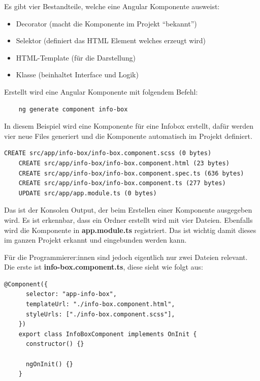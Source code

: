 \newpage

Es gibt vier Bestandteile, welche eine Angular Komponente ausweist:

\begin{itemize}
    \item Decorator (macht die Komponente im Projekt “bekannt”)
    \item Selektor (definiert das HTML Element welches erzeugt wird)
    \item HTML-Template (für die Darstellung)
    \item Klasse (beinhaltet Interface und Logik)
\end{itemize}

Erstellt wird eine Angular Komponente mit folgendem Befehl:

\begin{lstlisting}
    ng generate component info-box
\end{lstlisting}

In diesem Beispiel wird eine Komponente für eine Infobox erstellt, dafür werden vier neue Files generiert und die Komponente automatisch im Projekt definiert.

\begin{lstlisting}[caption=Komponente Erstellung Konsolenausgabe]
    CREATE src/app/info-box/info-box.component.scss (0 bytes)
    CREATE src/app/info-box/info-box.component.html (23 bytes)
    CREATE src/app/info-box/info-box.component.spec.ts (636 bytes)
    CREATE src/app/info-box/info-box.component.ts (277 bytes)
    UPDATE src/app/app.module.ts (0 bytes)
\end{lstlisting}

Das ist der Konsolen Output, der beim Erstellen einer Komponente ausgegeben wird. Es ist erkennbar, dass ein Ordner erstellt wird mit vier Dateien. Ebenfalls wird die Komponente in \textbf{app.module.ts} registriert. Das ist wichtig damit dieses im ganzen Projekt erkannt und eingebunden werden kann.

Für die Programmierer:innen sind jedoch eigentlich nur zwei Dateien relevant.
Die erste ist \textbf{info-box.component.ts}, diese sieht wie folgt aus:

\begin{lstlisting}[caption=Typescript Komponente Grundaufbau]
    @Component({
      selector: "app-info-box",
      templateUrl: "./info-box.component.html",
      styleUrls: ["./info-box.component.scss"],
    })
    export class InfoBoxComponent implements OnInit {
      constructor() {}
    
      ngOnInit() {}
    }
\end{lstlisting}

